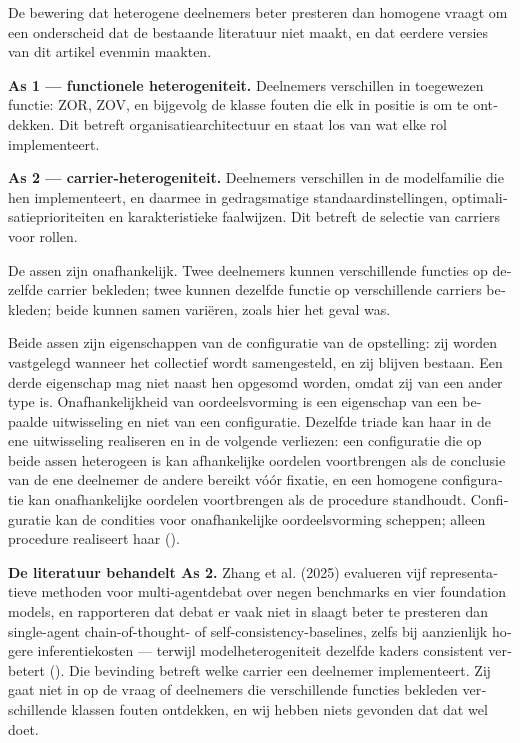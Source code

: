 \begin{dutch}
De bewering dat heterogene deelnemers beter presteren dan homogene vraagt om een onderscheid dat de bestaande literatuur niet maakt, en dat eerdere versies van dit artikel evenmin maakten.

\textbf{As 1 — functionele heterogeniteit.} Deelnemers verschillen in toegewezen functie: ZOR, ZOV, en bijgevolg de klasse fouten die elk in positie is om te ontdekken. Dit betreft organisatiearchitectuur en staat los van wat elke rol implementeert.

\textbf{As 2 — carrier-heterogeniteit.} Deelnemers verschillen in de modelfamilie die hen implementeert, en daarmee in gedragsmatige standaardinstellingen, optimalisatieprioriteiten en karakteristieke faalwijzen. Dit betreft de selectie van carriers voor rollen.

De assen zijn onafhankelijk. Twee deelnemers kunnen verschillende functies op dezelfde carrier bekleden; twee kunnen dezelfde functie op verschillende carriers bekleden; beide kunnen samen variëren, zoals hier het geval was.

Beide assen zijn eigenschappen van de configuratie van de opstelling: zij worden vastgelegd wanneer het collectief wordt samengesteld, en zij blijven bestaan. Een derde eigenschap mag niet naast hen opgesomd worden, omdat zij van een ander type is. Onafhankelijkheid van oordeelsvorming is een eigenschap van een bepaalde uitwisseling en niet van een configuratie. Dezelfde triade kan haar in de ene uitwisseling realiseren en in de volgende verliezen: een configuratie die op beide assen heterogeen is kan afhankelijke oordelen voortbrengen als de conclusie van de ene deelnemer de andere bereikt vóór fixatie, en een homogene configuratie kan onafhankelijke oordelen voortbrengen als de procedure standhoudt. Configuratie kan de condities voor onafhankelijke oordeelsvorming scheppen; alleen procedure realiseert haar ().

\textbf{De literatuur behandelt As 2.} Zhang et al. (2025) evalueren vijf representatieve methoden voor multi-agentdebat over negen benchmarks en vier foundation models, en rapporteren dat debat er vaak niet in slaagt beter te presteren dan single-agent chain-of-thought- of self-consistency-baselines, zelfs bij aanzienlijk hogere inferentiekosten — terwijl modelheterogeniteit dezelfde kaders consistent verbetert (). Die bevinding betreft welke carrier een deelnemer implementeert. Zij gaat niet in op de vraag of deelnemers die verschillende functies bekleden verschillende klassen fouten ontdekken, en wij hebben niets gevonden dat dat wel doet.


\end{dutch}

